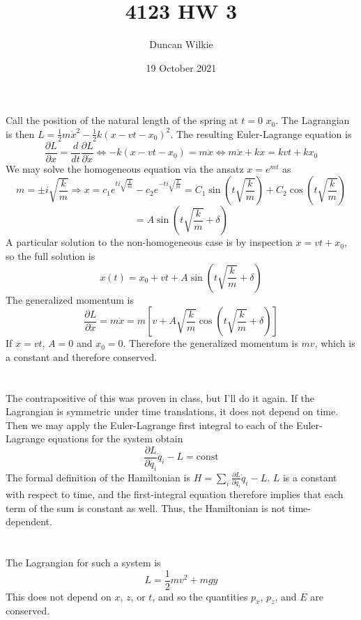 \documentclass{article}
\title{4123 HW 3}
\author{Duncan Wilkie}
\date{19 October 2021}
\begin{document}
\maketitle

\section{}
Call the position of the natural length of the spring at $t=0$ $x_0$.
The Lagrangian is then $L=\frac{1}{2}m\dot{x}^2-\frac{1}{2}k(x-vt-x_0)^2$. The resulting Euler-Lagrange equation is
\[\frac{\partial L}{\partial x}=\frac{d}{dt}\frac{\partial L}{\partial \dot{x}}\Leftrightarrow -k(x-vt-x_0)=m\ddot{x} \Leftrightarrow m\ddot{x}+kx =kvt+kx_0\]
We may solve the homogeneous equation via the ansatz $x=e^{mt}$ as \[m=\pm i\sqrt{\frac{k}{m}}\Rightarrow x=c_1e^{ti\sqrt{\frac{k}{m}}}-c_2e^{-ti\sqrt{\frac{k}{m}}}=C_1\sin\left(t\sqrt{\frac{k}{m}}\right)+C_2\cos\left(t\sqrt{\frac{k}{m}}\right)\]\[=A\sin\left(t\sqrt{\frac{k}{m}}+\delta\right)\]
A particular solution to the non-homogeneous case is by inspection $x=vt+x_0$, so the full solution is
\[x(t)=x_0+vt+A\sin\left(t\sqrt{\frac{k}{m}}+\delta\right)\]
The generalized momentum is\[\frac{\partial L}{\partial \dot{x}}=m\dot{x}=m\left[  v+A\sqrt{\frac{k}{m}}\cos\left( t\sqrt{\frac{k}{m}}+\delta \right)\right]\]
If $x=vt$, $A=0$ and $x_0=0$. Therefore the generalized momentum is $mv$, which is a constant and therefore conserved.

\section{}
The contrapositive of this was proven in class, but I'll do it again.
If the Lagrangian is symmetric under time translations, it does not depend on time. Then we may apply the Euler-Lagrange first integral to each of the Euler-Lagrange equations for the system obtain
\[\frac{\partial L}{\partial \dot{q_i}}\dot{q}_i-L = \textrm{const}\]
The formal definition of the Hamiltonian is $H=\sum_i\frac{\partial L}{\partial\dot{q}_i}\dot{q}_i- L $. $L$ is a constant with respect to time, and the first-integral equation therefore implies that each term of the sum is constant as well. Thus, the Hamiltonian is not time-dependent.

\section{}
The Lagrangian for such a system is
\[L=\frac{1}{2}mv^2+mgy\]
This does not depend on $x$, $z$, or $t$, and so the quantities $p_x$, $p_z$, and $E$ are conserved.
\end{document}
